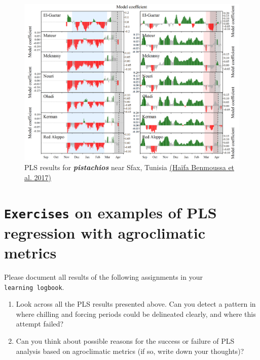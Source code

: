 \documentclass[
]{book}
\providecommand{\tightlist}{%
  \setlength{\itemsep}{0pt}\setlength{\parskip}{0pt}}
\begin{document}
\begin{figure}
\centering
\includegraphics{pictures/PLS_chill_force_pistachio_Tunisia.png}
\caption{PLS results for \textbf{\emph{pistachios}} near Sfax, Tunisia \href{https://www.sciencedirect.com/science/article/abs/pii/S0098847217301119}{(Haïfa Benmoussa et al. \protect\hyperlink{ref-benmoussa_performance_2017}{2017})}}
\end{figure}

\hypertarget{exercises_PLS_chill_force_ex}{%
\section*{\texorpdfstring{\texttt{Exercises} on examples of PLS regression with agroclimatic metrics}{Exercises on examples of PLS regression with agroclimatic metrics}}\label{exercises_PLS_chill_force_ex}}

Please document all results of the following assignments in your \texttt{learning\ logbook}.

\begin{enumerate}
\def\labelenumi{\arabic{enumi})}
\tightlist
\item
  Look across all the PLS results presented above. Can you detect a pattern in where chilling and forcing periods could be delineated clearly, and where this attempt failed?
\item
  Can you think about possible reasons for the success or failure of PLS analysis based on agroclimatic metrics (if so, write down your thoughts)?
\end{enumerate}
\end{document}
